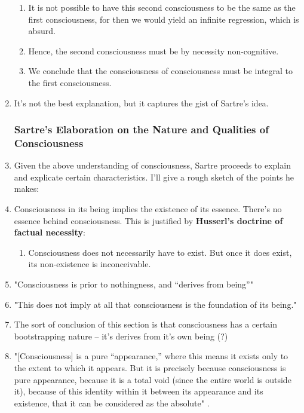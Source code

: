 \begin{enumerate}
\begin{enumerate}
    \item It is not possible to have this second consciousness to be the same as the first consciousness, for then we would yield an infinite regression, which is absurd.
    \item Hence, the second consciousness must be by necessity non-cognitive.
    \item We conclude that the consciousness of consciousness must be integral to the first consciousness.
  \end{enumerate}
  \item It's not the best explanation, but it captures the gist of Sartre's idea.

  \subsubsection{Sartre's Elaboration on the Nature and Qualities of Consciousness}
  \item Given the above understanding of consciousness, Sartre proceeds to explain and explicate certain characteristics. I'll give a rough sketch of the points he makes:
  \item Consciousness in its being implies the existence of its essence. There's no essence behind consciousness. This is justified by \textbf{Husserl's doctrine of factual necessity}:
  \begin{enumerate}
    \item Consciousness does not necessarily have to exist. But once it does exist, its non-existence is inconceivable.
  \end{enumerate}
  \item "Consciousness is prior to nothingness, and ``derives from being''" \autocite[15]{sartre}
  \item "This does not imply at all that consciousness is the foundation of its being."
  \item The sort of conclusion of this section is that consciousness has a certain bootstrapping nature -- it's derives from it's own being (?)
  \item "[Consciousness] is a pure ``appearance,'' where this means it exists only to the extent to which it appears. But it is precisely because consciousness is pure appearance, because it is a total void (since the entire world is outside it), because of this identity within it between its appearance and its existence, that it can be considered as the absolute" \autocite[16]{sartre}.
\end{enumerate}

